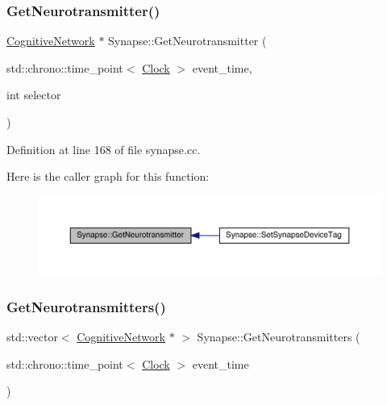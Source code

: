 \subsubsection{\texorpdfstring{Get\+Neurotransmitter()}{GetNeurotransmitter()}}
{\footnotesize\ttfamily \hyperlink{class_cognitive_network}{Cognitive\+Network} $\ast$ Synapse\+::\+Get\+Neurotransmitter (\begin{DoxyParamCaption}\item[{std\+::chrono\+::time\+\_\+point$<$ \hyperlink{universe_8h_a0ef8d951d1ca5ab3cfaf7ab4c7a6fd80}{Clock} $>$}]{event\+\_\+time,  }\item[{int}]{selector }\end{DoxyParamCaption})}



Definition at line 168 of file synapse.\+cc.

Here is the caller graph for this function\+:\nopagebreak
\begin{figure}[H]
\begin{center}
\leavevmode
\includegraphics[width=350pt]{class_synapse_aee76302a55cb0728497caa7a9f5ddeb5_icgraph}
\end{center}
\end{figure}
\mbox{\label{class_synapse_a16d2d8025a2955be987731990309316a}} 
\subsubsection{\texorpdfstring{Get\+Neurotransmitters()}{GetNeurotransmitters()}}
{\footnotesize\ttfamily std\+::vector$<$ \hyperlink{class_cognitive_network}{Cognitive\+Network} $\ast$ $>$ Synapse\+::\+Get\+Neurotransmitters (\begin{DoxyParamCaption}\item[{std\+::chrono\+::time\+\_\+point$<$ \hyperlink{universe_8h_a0ef8d951d1ca5ab3cfaf7ab4c7a6fd80}{Clock} $>$}]{event\+\_\+time }\end{DoxyParamCaption})}



